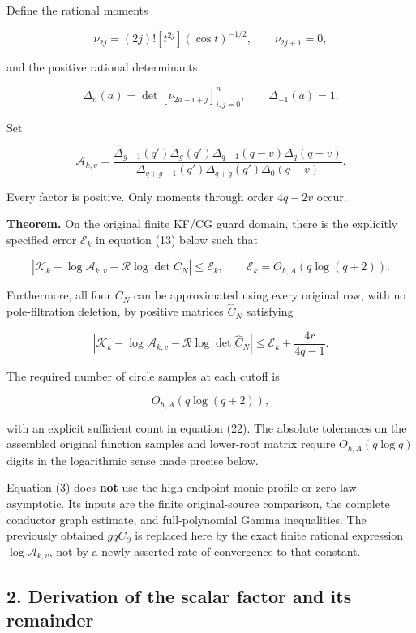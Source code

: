 \documentclass[11pt]{article}
\begin{document}
Define the rational moments

\[
\nu_{2j}=(2j)![t^{2j}](\cos t)^{-1/2},
\qquad \nu_{2j+1}=0,
\]

and the positive rational determinants

\[
\Delta_n(a)=
\det[\nu_{2a+i+j}]_{i,j=0}^{n},
\qquad
\Delta_{-1}(a)=1.
\]

Set

\[
\boxed{
\mathcal A_{k,v}
=
\frac{
\Delta_{g-1}(q')\Delta_g(q')
\Delta_{q-1}(q-v)\Delta_q(q-v)
}{
\Delta_{q+g-1}(q')\Delta_{q+g}(q')
\Delta_0(q-v)
}.
}
\tag{2}
\]

Every factor is positive. Only moments through order \(4q-2v\) occur.

\textbf{Theorem.} On the original finite KF/CG guard domain, there is the explicitly specified error \(\mathcal E_k\) in equation (13) below such that

\[
\boxed{
\left|
\mathcal K_k
-\log\mathcal A_{k,v}
-\mathcal R\log\det C_N
\right|
\le \mathcal E_k,
\qquad
\mathcal E_k=O_{h,A}(q\log(q+2)).
}
\tag{3}
\]

Furthermore, all four \(C_N\) can be approximated using every original row, with no pole-filtration deletion, by positive matrices \(\widehat C_N\) satisfying

\[
\boxed{
\left|
\mathcal K_k
-\log\mathcal A_{k,v}
-\mathcal R\log\det\widehat C_N
\right|
\le
\mathcal E_k+\frac{4r}{4q-1}.
}
\tag{4}
\]

The required number of circle samples at each cutoff is

\[
O_{h,A}(q\log(q+2)),
\]

with an explicit sufficient count in equation (22). The absolute tolerances on the assembled original function samples and lower-root matrix require \(O_{h,A}(q\log q)\) digits in the logarithmic sense made precise below.

Equation (3) does \textbf{not} use the high-endpoint monic-profile or zero-law asymptotic. Its inputs are the finite original-source comparison, the complete conductor graph estimate, and full-polynomial Gamma inequalities. The previously obtained \(gqC_\partial\) is replaced here by the exact finite rational expression \(\log\mathcal A_{k,v}\), not by a newly asserted rate of convergence to that constant.

\subsection{2. Derivation of the scalar factor and its remainder}\label{derivation-of-the-scalar-factor-and-its-remainder}
\end{document}
